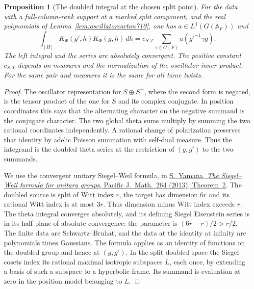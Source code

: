 \documentclass[a4paper,11pt]{article}
\newtheorem{proposition}{Proposition}[section]
\theoremstyle{definition}
\theoremstyle{remark}
\numberwithin{equation}{section}
\begin{document}
\begin{proposition}[The doubled integral at the chosen split point]\leavevmode
\label{prop:doubledkernel711}
For the data with a full-column-rank support at a marked
split component, and the real polynomials of
Lemma~\ref{lem:oscillatorcartan710}, one has
\(a\in L^1(G(\mathbb A_F))\) and
\[
 \int_{[H]}\overline{K_\Phi(g',h)}K_\Phi(g,h)\,dh
       =c_{S,T}\sum_{\gamma\in G(F)}a(g'^{-1}\gamma g).
\]
The left integral and the series are absolutely convergent.
The positive constant \(c_{S,T}\) depends on measures and
the normalization of the oscillator inner product. For the
same pair and measures it is the same for all tame twists.
\end{proposition}
\begin{proof}
The oscillator representation for \(S\oplus S^-\), where
the second form is negated, is the tensor product of the
one for \(S\) and its complex conjugate. In position
coordinates this says that the alternating character on
the negative summand is the conjugate character. The two
global theta sums multiply by summing the two rational
coordinates independently. A rational change of polarization
preserves that identity by adelic Poisson summation with
self-dual measure. Thus the integrand is the doubled theta
series at the restriction of \((g,g')\) to the two summands.

We use the convergent unitary Siegel--Weil formula, in
\href{https://msp.org/pjm/2013/264-1/pjm-v264-n1-p11-s.pdf}
{S.~Yamana, \emph{The Siegel--Weil formula for unitary
groups}, Pacific J.~Math.~264 (2013), Theorem~2}.
The doubled source is split of Witt index \(r\), the target
has dimension \(6r\) and its rational Witt index is at
most \(3r\). Thus dimension minus Witt index exceeds \(r\).
The theta integral converges absolutely, and its defining
Siegel Eisenstein series is in its half-plane of absolute
convergence: the parameter is \((6r-r)/2>r/2\). The finite
data are Schwartz--Bruhat, and the data at the identity
at infinity are polynomials times Gaussians. The formula
applies as an identity of functions on the doubled group
and hence at \((g,g')\). In the split doubled space the
Siegel cosets index its rational maximal isotropic subspaces
\(L\), each once, by extending a basis of such a subspace
to a hyperbolic frame. Its summand is evaluation at zero
in the position model belonging to \(L\).


\end{proof}
\end{document}
